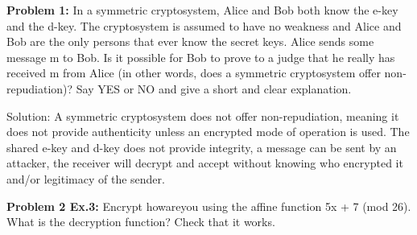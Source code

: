 \documentclass[12pt,letterpaper,final]{report}
\begin{document}

\vline


\noindent\textbf{Problem 1:} In a symmetric cryptosystem, Alice and Bob both know the e-key and the d-key. The cryptosystem is assumed to  have no weakness and Alice and Bob are the only persons that ever know the secret keys. Alice sends some message m to Bob. Is it possible for Bob to prove to a judge that he really has received m from Alice (in other words, does a symmetric cryptosystem offer non-repudiation)? Say YES or NO and give a short and clear explanation.

\bigskip  Solution: A symmetric cryptosystem does not offer non-repudiation, meaning it does not provide authenticity unless an encrypted mode of operation is used. The shared e-key and d-key does not provide integrity, a message can be sent by an attacker, the receiver will decrypt and accept without knowing who encrypted it and/or legitimacy of the sender.

\bigskip
\noindent\textbf{Problem 2 Ex.3:} Encrypt howareyou using the affine function 5x + 7 (mod 26). What is
the decryption function? Check that it works.
\end{document}
